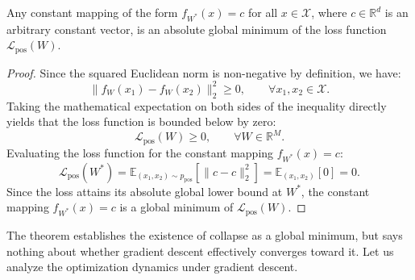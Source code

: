 \documentclass[11pt, oneside, openany]{book}
\begin{document}
\begin{theorem}
\label{thm:3.1}
Any constant mapping of the form $f_{W^{*}}(x) = c$ for all $x \in \mathcal{X}$, where $c \in \mathbb{R}^{d}$ is an arbitrary constant vector, is an absolute global minimum of the loss function $\mathcal{L}_{\text{pos}}(W)$.
\end{theorem}

\begin{proof}
Since the squared Euclidean norm is non-negative by definition, we have:
\begin{equation}
\label{eq:3.5}
\lVert f_{W}(x_{1}) - f_{W}(x_{2}) \rVert_{2}^{2} \geq 0, \qquad \forall x_{1}, x_{2} \in \mathcal{X}.
\end{equation}
Taking the mathematical expectation on both sides of the inequality directly yields that the loss function is bounded below by zero:
\begin{equation}
\label{eq:3.6}
\mathcal{L}_{\text{pos}}(W) \geq 0, \qquad \forall W \in \mathbb{R}^{M}.
\end{equation}
Evaluating the loss function for the constant mapping $f_{W^{*}}(x) = c$:
\begin{equation}
\label{eq:3.7}
\mathcal{L}_{\text{pos}}(W^{*}) = \mathbb{E}_{(x_{1}, x_{2}) \sim p_{\text{pos}}} \left[ \lVert c - c \rVert_{2}^{2} \right] = \mathbb{E}_{(x_{1}, x_{2})}[0] = 0.
\end{equation}
Since the loss attains its absolute global lower bound at $W^{*}$, the constant mapping $f_{W^{*}}(x) = c$ is a global minimum of $\mathcal{L}_{\text{pos}}(W)$.
\end{proof}

The theorem establishes the existence of collapse as a global minimum, but says nothing about whether gradient descent effectively converges toward it. Let us analyze the optimization dynamics under gradient descent.
\end{document}
